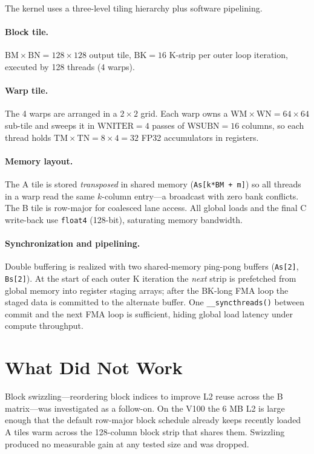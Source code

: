 \documentclass{article}
\begin{document}
The kernel uses a three-level tiling hierarchy plus software pipelining.

\paragraph{Block tile.}
$\text{BM} \times \text{BN} = 128 \times 128$ output tile, $\text{BK} = 16$ K-strip per outer loop
iteration, executed by 128 threads (4 warps).

\paragraph{Warp tile.}
The 4 warps are arranged in a $2 \times 2$ grid.
Each warp owns a $\text{WM} \times \text{WN} = 64 \times 64$ sub-tile and sweeps it in
$\text{WNITER} = 4$ passes of $\text{WSUBN} = 16$ columns, so each thread holds
$\text{TM} \times \text{TN} = 8 \times 4 = 32$ FP32 accumulators in registers.

\paragraph{Memory layout.}
The A tile is stored \emph{transposed} in shared memory (\texttt{As[k*BM + m]})
so all threads in a warp read the same $k$-column entry---a broadcast with zero bank conflicts.
The B tile is row-major for coalesced lane access.
All global loads and the final C write-back use \texttt{float4} (128-bit), saturating memory bandwidth.

\paragraph{Synchronization and pipelining.}
Double buffering is realized with two shared-memory ping-pong buffers (\texttt{As[2]}, \texttt{Bs[2]}).
At the start of each outer K iteration the \emph{next} strip is prefetched from global memory into
register staging arrays; after the BK-long FMA loop the staged data is committed to the alternate
buffer.
One \texttt{\_\_syncthreads()} between commit and the next FMA loop is sufficient, hiding global
load latency under compute throughput.

\section{What Did Not Work}

Block swizzling---reordering block indices to improve L2 reuse across the B matrix---was
investigated as a follow-on.
On the V100 the 6 MB L2 is large enough that the default row-major block schedule already
keeps recently loaded A tiles warm across the 128-column block strip that shares them.
Swizzling produced no measurable gain at any tested size and was dropped.
\end{document}
